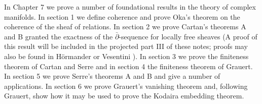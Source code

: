 In Chapter 7 we prove a number of foundational results in the theory of complex manifolds. In section 1 we define coherence and prove Oka's theorem on the coherence of the sheaf of relations. In
section 2 we prove Cartan's theorems A and B granted the exactness of the $\bar\partial$-sequence for locally free sheaves (A proof of this result will be included in the projected part III of these notes; proofs may also be found in H\"ormander \cite{bib:II:hormander-l:1} or Vesentini \cite{bib:II:vesentini-e:1}). In section 3 we prove the finiteness theorem of Cartan and Serre and in section 4 the finiteness theorem of Grauert. In section 5 we prove Serre's theorems A and B and give a number of applications. In section 6 we prove Grauert's vanishing theorem and, following Grauert, show how it may be used to prove the Kodaira embedding theorem.

